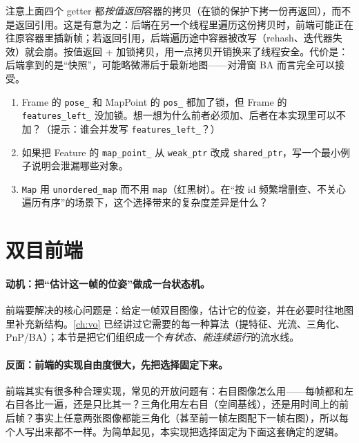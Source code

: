 \begin{pitfall}
注意上面四个 getter 都\emph{按值返回}容器的拷贝（在锁的保护下拷一份再返回），而不是返回引用。这是有意为之：后端在另一个线程里遍历这份拷贝时，前端可能正在往原容器里插新帧；若返回引用，后端遍历途中容器被改写（rehash、迭代器失效）就会崩。按值返回 + 加锁拷贝，用一点拷贝开销换来了线程安全。代价是：后端拿到的是“快照”，可能略微滞后于最新地图——对滑窗 BA 而言完全可以接受。
\end{pitfall}

\begin{practice}[练习]
\begin{enumerate}
  \item Frame 的 \texttt{pose\_} 和 MapPoint 的 \texttt{pos\_} 都加了锁，但 Frame 的 \texttt{features\_left\_} 没加锁。想一想为什么前者必须加、后者在本实现里可以不加？（提示：谁会并发写 \texttt{features\_left\_}？）
  \item 如果把 Feature 的 \texttt{map\_point\_} 从 \texttt{weak\_ptr} 改成 \texttt{shared\_ptr}，写一个最小例子说明会泄漏哪些对象。
  \item \texttt{Map} 用 \texttt{unordered\_map} 而不用 \texttt{map}（红黑树）。在“按 id 频繁增删查、不关心遍历有序”的场景下，这个选择带来的复杂度差异是什么？
\end{enumerate}
\end{practice}

\section{双目前端}
\label{sec:sys-frontend}

\paragraph{动机：把“估计这一帧的位姿”做成一台状态机。}
前端要解决的核心问题是：给定一帧双目图像，估计它的位姿，并在必要时往地图里补充新结构。\cref{ch:vo} 已经讲过它需要的每一种算法（提特征、光流、三角化、PnP/BA）；本节是把它们组织成一个\emph{有状态、能连续运行}的流水线。

\paragraph{反面：前端的实现自由度很大，先把选择固定下来。}
前端其实有很多种合理实现，常见的开放问题有：右目图像怎么用——每帧都和左右目各比一遍，还是只比其一？三角化用左右目（空间基线），还是用时间上的前后帧？事实上任意两张图像都能三角化（甚至前一帧左图配下一帧右图），所以每个人写出来都不一样。为简单起见，本实现把选择固定为下面这套确定的逻辑。

